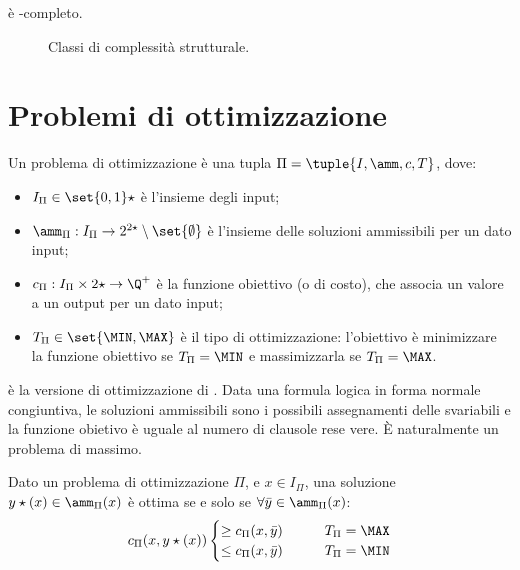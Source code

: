 \begin{theorem}
	\Sat è \NP-completo.
\end{theorem}

\begin{figure}
	\centering
	
	\caption{Classi di complessità strutturale.}
	\label{fig:structcomplclass}
\end{figure}



\section{Problemi di ottimizzazione}

\begin{defin}
	Un problema di ottimizzazione è una tupla $\Pi=\tuple{I,\amm,c,T}$, dove:
	\begin{itemize}
		\item $I_\Pi\in\set{0,1}\star$ è l'insieme degli input;
		\item $\amm_\Pi: I_\Pi\to2^{2\star}\setminus\set{\emptyset}$ è l'insieme delle soluzioni ammissibili per un dato input;
		\item $c_\Pi:I_\Pi\times 2\star\to\Q^+$ è la funzione obiettivo (o di costo), che associa un valore a un output per un dato input;
		\item $T_\Pi \in\set{\MIN,\MAX}$ è il tipo di ottimizzazione: l'obiettivo è minimizzare la funzione obiettivo se $T_\Pi=\MIN$ e massimizzarla se $T_\Pi=\MAX$.
	\end{itemize}
\end{defin}

\begin{examp}
	\MaxSat è la versione di ottimizzazione di \Sat. Data una formula logica in forma normale congiuntiva, le soluzioni ammissibili sono i possibili assegnamenti delle svariabili e la funzione obietivo è uguale al numero di clausole rese vere. È naturalmente un problema di massimo.
\end{examp}

\begin{defin}
	Dato un problema di ottimizzazione $\Pi$, e $x\in I_\Pi$, una soluzione $y\star(x)\in\amm_\Pi(x)$ è ottima se e solo se $\forall \bar y\in\amm_\Pi(x)$:
	\begin{equation*}
		c_\Pi(x,y\star(x))
		\begin{cases}
			\geq c_\Pi(x,\bar y) \qquad & T_\Pi=\MAX \\
			\leq c_\Pi(x,\bar y) \qquad & T_\Pi=\MIN
		\end{cases}
	\end{equation*}
\end{defin}

